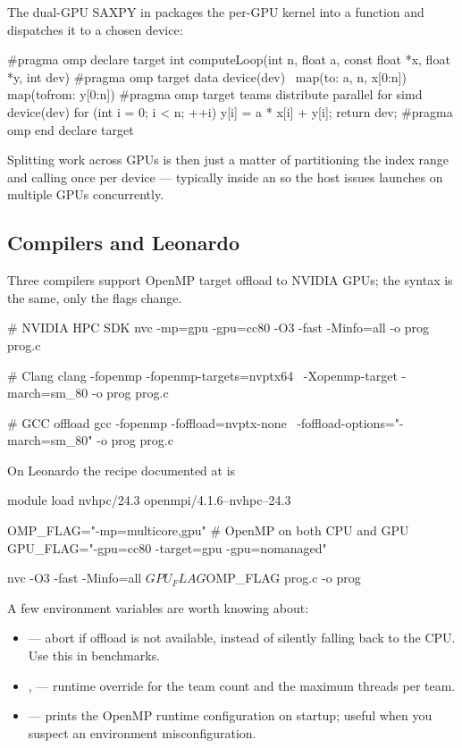 The dual-GPU SAXPY in  packages the per-GPU kernel into a  function and dispatches it to a chosen device:

\begin{codeblock}[language=C]
#pragma omp declare target
int computeLoop(int n, float a, const float *x, float *y, int dev) {
    #pragma omp target data device(dev) \
            map(to: a, n, x[0:n]) map(tofrom: y[0:n])
    {
        #pragma omp target teams distribute parallel for simd device(dev)
        for (int i = 0; i < n; ++i)
            y[i] = a * x[i] + y[i];
    }
    return dev;
}
#pragma omp end declare target
\end{codeblock}

Splitting work across GPUs is then just a matter of partitioning the index range and calling  once per device --- typically inside an  so the host issues launches on multiple GPUs concurrently.

\subsection{Compilers and Leonardo}

Three compilers support OpenMP target offload to NVIDIA GPUs; the syntax is the same, only the flags change.

\begin{codeblock}[language=bash]
# NVIDIA HPC SDK
nvc -mp=gpu -gpu=cc80 -O3 -fast -Minfo=all -o prog prog.c

# Clang
clang -fopenmp -fopenmp-targets=nvptx64 \
      -Xopenmp-target -march=sm_80 -o prog prog.c

# GCC offload
gcc -fopenmp -foffload=nvptx-none \
    -foffload-options="-march=sm_80" -o prog prog.c
\end{codeblock}

On Leonardo the recipe documented at  is

\begin{codeblock}[language=bash]
module load nvhpc/24.3 openmpi/4.1.6--nvhpc--24.3

OMP_FLAG="-mp=multicore,gpu"      # OpenMP on both CPU and GPU
GPU_FLAG="-gpu=cc80 -target=gpu -gpu=nomanaged"

nvc -O3 -fast -Minfo=all $GPU_FLAG $OMP_FLAG prog.c -o prog
\end{codeblock}

A few environment variables are worth knowing about:
\begin{itemize}
    \item {} --- abort if offload is not available, instead of silently falling back to the CPU. Use this in benchmarks.
    \item \plaintt{OMP\_NUM\_TEAMS},  --- runtime override for the team count and the maximum threads per team.
    \item {} --- prints the OpenMP runtime configuration on startup; useful when you suspect an environment misconfiguration.
\end{itemize}


